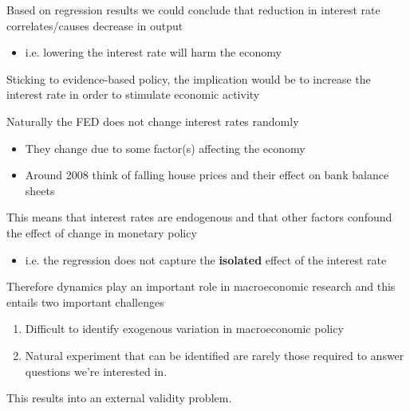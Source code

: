 \documentclass{beamer}
\begin{document}
\begin{frame}
 Based on regression results we could conclude that reduction in interest rate correlates/causes decrease in output
 \begin{itemize}
   \item i.e. lowering the interest rate will harm the economy
 \end{itemize}
 \medskip
 Sticking to evidence-based policy, the implication would be to increase the interest rate in order to stimulate economic activity
\end{frame}

\begin{frame}
  Naturally the FED does not change interest rates randomly
  \begin{itemize}
    \item They change due to some factor(s) affecting the economy
    \item Around 2008 think of falling house prices and their effect on bank balance sheets
  \end{itemize}
  \medskip
  This means that interest rates are endogenous and that other factors confound the effect of change in monetary policy
  \begin{itemize}
    \item i.e. the regression does not capture the \textbf{isolated} effect of the interest rate
  \end{itemize}
\end{frame}

\begin{frame}
  Therefore dynamics play an important role in macroeconomic research and this entails two important challenges  
  \begin{enumerate}
    \item Difficult to identify exogenous variation in macroeconomic policy
    \item Natural experiment that can be identified are rarely those required to answer questions we're interested in. 
  \end{enumerate}
  \medskip
  This results into an external validity problem.  
\end{frame}
\end{document}

